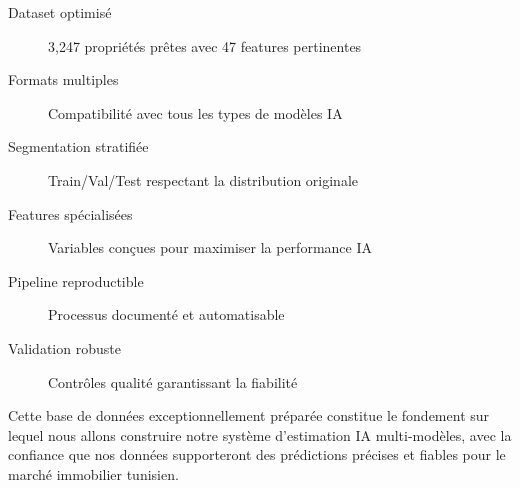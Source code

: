 \begin{description}
    \item[Dataset optimisé] 3,247 propriétés prêtes avec 47 features pertinentes
    \item[Formats multiples] Compatibilité avec tous les types de modèles IA
    \item[Segmentation stratifiée] Train/Val/Test respectant la distribution originale
    \item[Features spécialisées] Variables conçues pour maximiser la performance IA
    \item[Pipeline reproductible] Processus documenté et automatisable
    \item[Validation robuste] Contrôles qualité garantissant la fiabilité
\end{description}

Cette base de données exceptionnellement préparée constitue le fondement sur lequel nous allons construire notre système d'estimation IA multi-modèles, avec la confiance que nos données supporteront des prédictions précises et fiables pour le marché immobilier tunisien.
